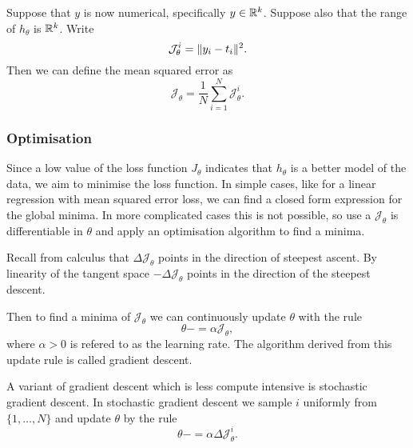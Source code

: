 \begin{example}
    Suppose that $y$ is now numerical, specifically $y \in \mathbb{R}^k$. Suppose also that the range of $h_{\theta}$ is $\mathbb{R}^k$. Write
    $$
    \mathcal{J}_\theta^i = \lVert y_i - t_i\rVert^2.
    $$
    Then we can define the mean squared error as
    $$
    \mathcal{J}_\theta = \frac{1}{N} \sum_{i=1}^N \mathcal{J}_\theta^i.
    $$
\end{example}


\subsubsection{Optimisation}

Since a low value of the loss function $J_{\theta}$ indicates that $h_\theta$ is a better model of the data, we aim to minimise the loss function. In simple cases, like for a linear regression with mean squared error loss, we can find a closed form expression for the global minima. In more complicated cases this is not possible, so use a $\mathcal{J}_{\theta}$ is differentiable in $\theta$ and apply an optimisation algorithm to find a minima.

\begin{example}
    Recall from calculus that $\Delta \mathcal{J}_{\theta}$ points in the direction of steepest ascent. By linearity of the tangent space $-\Delta \mathcal{J}_{\theta}$ points in the direction of the steepest descent.

    Then to find a minima of $\mathcal{J}_{\theta}$ we can continuously update $\theta$ with the rule
    $$
    \theta -= \alpha \mathcal{J}_{\theta},
    $$
    where $\alpha > 0$ is refered to as the learning rate. The algorithm derived from this update rule is called gradient descent. 
\end{example}

\begin{example}
    A variant of gradient descent which is less compute intensive is stochastic gradient descent. In stochastic gradient descent we sample $i$ uniformly from $\{1, \ldots, N\}$ and update $\theta$ by the rule
    $$
    \theta -= \alpha \Delta \mathcal{J}_{\theta}^i.
    $$
\end{example}

